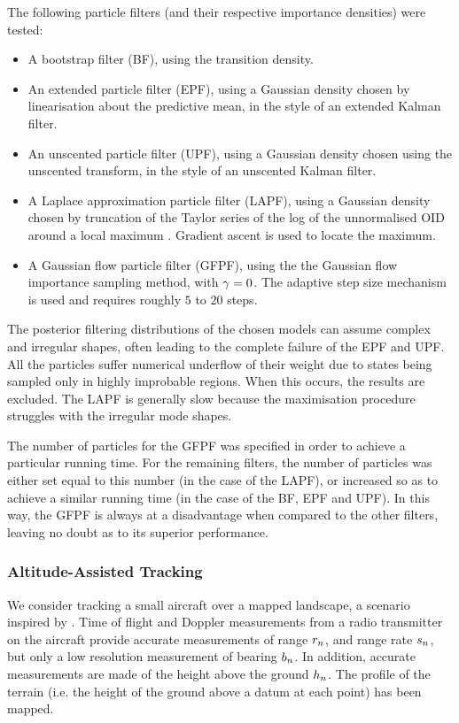 \documentclass{article}
\begin{document}
The following particle filters (and their respective importance densities) were tested:
\begin{itemize}
        \item A bootstrap filter (BF), using the transition density. \citep{Gordon1993}
        \item An extended particle filter (EPF), using a Gaussian density chosen by linearisation about the predictive mean, in the style of an extended Kalman filter. \citep{Doucet2000a}
        \item An unscented particle filter (UPF), using a Gaussian density chosen using the unscented transform, in the style of an unscented Kalman filter. \citep{Merwe2000}
        \item A Laplace approximation particle filter (LAPF), using a Gaussian density chosen by truncation of the Taylor series of the log of the unnormalised OID around a local maximum \citep{Doucet2000a}. Gradient ascent is used to locate the maximum.
        \item A Gaussian flow particle filter (GFPF), using the the Gaussian flow importance sampling method, with $\gamma=0$. The adaptive step size mechanism is used and requires roughly $5$ to $20$ steps.
\end{itemize}

The posterior filtering distributions of the chosen models can assume complex and irregular shapes, often leading to the complete failure of the EPF and UPF. All the particles suffer numerical underflow of their weight due to states being sampled only in highly improbable regions. When this occurs, the results are excluded. The LAPF is generally slow because the maximisation procedure struggles with the irregular mode shapes.

The number of particles for the GFPF was specified in order to achieve a particular running time. For the remaining filters, the number of particles was either set equal to this number (in the case of the LAPF), or increased so as to achieve a similar running time (in the case of the BF, EPF and UPF). In this way, the GFPF is always at a disadvantage when compared to the other filters, leaving no doubt as to its superior performance.

\subsubsection{Altitude-Assisted Tracking}
We consider tracking a small aircraft over a mapped landscape, a scenario inspired by \cite{Schon2005}. Time of flight and Doppler measurements from a radio transmitter on the aircraft provide accurate measurements of range $r_{n}$, and range rate $s_{n}$, but only a low resolution measurement of bearing $b_{n}$. In addition, accurate measurements are made of the height above the ground $h_{n}$. The profile of the terrain (i.e. the height of the ground above a datum at each point) has been mapped.
\end{document}
